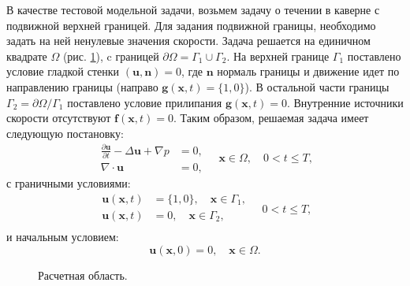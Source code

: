 \documentclass[12pt]{article}
\begin{document}
В качестве тестовой модельной задачи, возьмем задачу о течении в каверне с подвижной верхней границей. 
Для задания подвижной границы, необходимо задать на ней ненулевые значения скорости.
Задача решается на единичном квадрате $\Omega$ (рис. \ref{fg:cavity}), c границей $\partial \Omega=\Gamma_1 \cup \Gamma_2$. На верхней границе $\Gamma_1$ поставлено условие гладкой стенки $({\bm u}, {\bm n}) = 0$, где ${\bm n}$ нормаль границы и движение идет по направлению границы (направо ${\bm g}({\bm x},t)=\{1,0\}$). 
В остальной части границы $\Gamma_2=\partial \Omega / \Gamma_1$ поставлено условие прилипания ${\bm g}({\bm x}, t)=0$. Внутренние источники скорости отсутствуют ${\bm f}({\bm x}, t)=0$. Таким образом, решаемая задача имеет следующую постановку:
\begin{equation}
\begin{aligned}
\frac{\partial {\bm u}}{\partial t} -\Delta {\bm u} + \nabla p &= 0, \\
\nabla\cdot{\bm u} &= 0, 
\end{aligned}
\quad {\bm x} \in \Omega, \quad 0<t \leq T,
\label{eq:scheme-main}
\end{equation} 
с граничными условиями:
\begin{equation}
\begin{split}
{\bm u({\bm x}, t)} &= \{1, 0\}, \quad {\bm x} \in \Gamma_1, \\
{\bm u({\bm x}, t)} &= 0, \quad {\bm x} \in \Gamma_2, \\
\end{split}
\quad 0<t \leq T,
\label{eq:scheme-boundary}
\end{equation} 
и начальным условием:
\begin{equation}
{\bm u({\bm x}, 0)} = 0, \quad {\bm x} \in \Omega.
\label{eq:scheme-start}
\end{equation}

\begin{figure}
	\begin{center}
		\caption{Расчетная область.}
		\label{fg:cavity}
	\end{center}
\end{figure}
\end{document}

